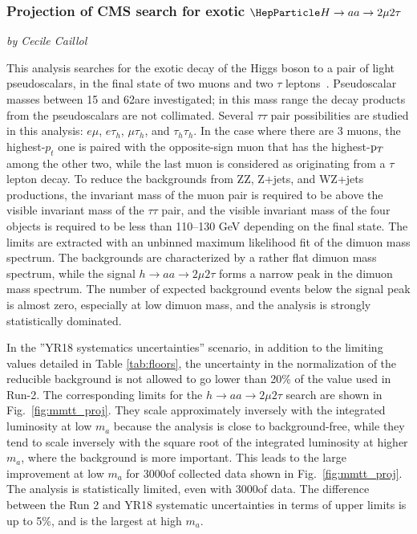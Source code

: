 \subsubsection{Projection of CMS search for exotic $\PH\to aa \to 2\mu 2\tau$}
\begin{center}
 {\it{ by Cecile Caillol}}
\end{center}


This analysis searches for the exotic decay of the Higgs boson to a pair of light pseudoscalars, in the
final state of two muons and two $\tau$ leptons~\cite{Sirunyan:2018mbx}. Pseudoscalar
masses between 15 and 62\GeV are investigated; in this mass range the decay products from the pseudoscalars are
not collimated.
Several $\tau\tau$ pair possibilities are studied in this analysis: $e\mu$, $e\tau_h$,
$\mu\tau_h$, and $\tau_h\tau_h$. In the case where there are 3 muons, the highest-$p_t$ one is paired with
the opposite-sign muon that has the highest-$\mathrm{p}_{T}$ among the other two, while the last muon is considered as
originating from a $\tau$ lepton decay.
To reduce the backgrounds from ZZ, Z+jets, and WZ+jets productions, the invariant mass of the muon pair
is required to be above the visible invariant mass of the $\tau\tau$ pair, and the
visible invariant mass of the four objects is required to be less than 110--130 GeV depending on the final state.
The limits are extracted with an unbinned maximum likelihood fit of the dimuon mass spectrum.
The backgrounds are characterized by a rather flat dimuon mass spectrum, while the signal $h\to aa \to 2\mu2\tau$
forms a narrow peak in the dimuon mass spectrum.
The number of expected background events below the signal peak is almost zero,
especially at low dimuon mass, and the analysis is strongly statistically dominated.

In the ''YR18 systematics uncertainties'' scenario, in addition to the limiting values detailed in Table \ref{tab:floors}, the uncertainty in the normalization of the reducible background is not allowed to go lower than 20\% of the value used in Run-2. The corresponding limits for the $h \to aa \to 2\mu2\tau$ search are shown in Fig.~\ref{fig:mmtt_proj}.
They scale approximately inversely with the integrated luminosity at low $m_a$ because the
analysis is close to background-free, while they tend to scale inversely with the square root of the integrated luminosity at higher $m_a$, where the background is more important. This leads to the large improvement at low $m_a$ for 3000\fbinv of collected data shown in Fig.~\ref{fig:mmtt_proj}. The analysis is statistically limited, even with 3000\fbinv of data. The difference between the Run 2 and YR18 systematic uncertainties in terms of upper limits
is up to 5\%, and is the largest at high $m_a$.

